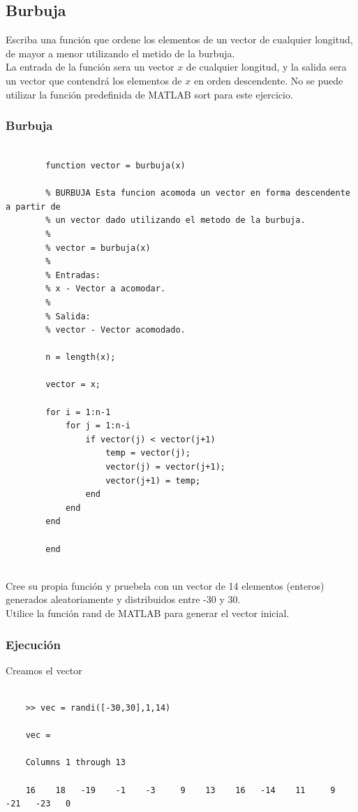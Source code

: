 \documentclass{article}
\begin{document}
	 \subsection{Burbuja}
	 
	 Escriba una función que ordene los elementos de un vector de cualquier longitud, de mayor a menor utilizando el metido de la burbuja.
	 \\
	 
	 La entrada de la función sera un vector $x$ de cualquier longitud, y la salida sera un vector que contendrá los elementos de $x$ en orden descendente. No se puede utilizar la función predefinida de MATLAB sort para este ejercicio.
	 
	 \subsubsection{Burbuja}
	 
	 \begin{lstlisting}
	 	
	 	function vector = burbuja(x)
	 	
	 	% BURBUJA Esta funcion acomoda un vector en forma descendente a partir de
	 	% un vector dado utilizando el metodo de la burbuja.
	 	%
	 	% vector = burbuja(x)
	 	%
	 	% Entradas:
	 	% x - Vector a acomodar.
	 	% 
	 	% Salida:
	 	% vector - Vector acomodado.
	 	
	 	n = length(x);
	 	
	 	vector = x;
	 	
	 	for i = 1:n-1
		 	for j = 1:n-i
			 	if vector(j) < vector(j+1)
				 	temp = vector(j);
				 	vector(j) = vector(j+1);
				 	vector(j+1) = temp;
			 	end
			end
		end
		
	 	end
	 	
	 \end{lstlisting}
	 
	 Cree su propia función y pruebela con un vector de 14 elementos (enteros) generados aleatoriamente y distribuidos entre -30 y 30.
	 \\
	 
	 Utilice la función rand de MATLAB para generar el vector inicial.
	 
	 \subsubsection{Ejecución}
	 
	 Creamos el vector
	 \\
	 
	\begin{lstlisting}
	
	>> vec = randi([-30,30],1,14)
	
	vec =
	
	Columns 1 through 13
	
	16    18   -19    -1    -3     9    13    16   -14    11     9   -21   -23   0
	
	\end{lstlisting}
	
\end{document}
